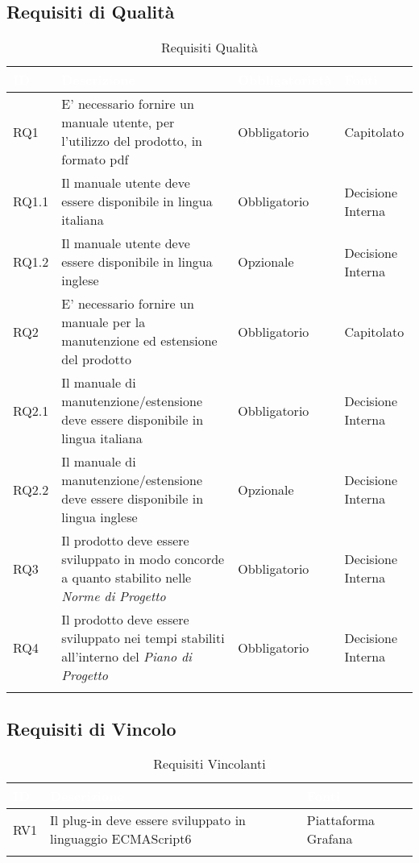 \subsection{Requisiti di Qualità}\label{RQ}
\begin{center}
\begin{longtable}[c]{|m{}|m{}|m{}|m{}|}
\hline
\rowcolor{bluelogo}\textbf{\textcolor{white}{ID}} & \textbf{\textcolor{white}{Descrizione}} & \textbf{\textcolor{white}{Obbligatorietà}} & \textbf{\textcolor{white}{Fonti}}\\
\hline \hline
\endfirsthead
RQ1 & E' necessario fornire un manuale utente, per l'utilizzo del prodotto, in formato pdf & Obbligatorio & Capitolato\\
\hline
\rowcolor{grigio}RQ1.1 & Il manuale utente deve essere disponibile in lingua italiana & Obbligatorio & Decisione Interna\\
\hline
RQ1.2 & Il manuale utente deve essere disponibile in lingua inglese & Opzionale & Decisione Interna\\
\hline
\rowcolor{grigio}RQ2 & E' necessario fornire un manuale per la manutenzione ed estensione del prodotto & Obbligatorio & Capitolato\\
\hline
RQ2.1 & Il manuale di manutenzione/estensione deve essere disponibile in lingua italiana & Obbligatorio & Decisione Interna\\
\hline
\rowcolor{grigio}RQ2.2 & Il manuale di manutenzione/estensione deve essere disponibile in lingua inglese & Opzionale & Decisione Interna\\
\hline
RQ3 & Il prodotto deve essere sviluppato in modo concorde a quanto stabilito nelle \textit{Norme di Progetto} & Obbligatorio & Decisione Interna\\
\hline
\rowcolor{grigio}RQ4 & Il prodotto deve essere sviluppato nei tempi stabiliti all'interno del \textit{Piano di Progetto} & Obbligatorio & Decisione Interna\\
\hline
\caption{Requisiti Qualità}
\end{longtable}
\end{center}

\subsection{Requisiti di Vincolo}\label{RV}
\begin{center}
\begin{longtable}[c]{|m{}|m{}|m{}|}
\hline
\rowcolor{bluelogo}\textbf{\textcolor{white}{ID}} & \textbf{\textcolor{white}{Descrizione}} & \textbf{\textcolor{white}{Fonti}}\\
\hline \hline
\endfirsthead
RV1 & Il plug-in deve essere sviluppato in linguaggio ECMAScript6 & Piattaforma Grafana\\
\hline
\caption{Requisiti Vincolanti}
\end{longtable}
\end{center}
